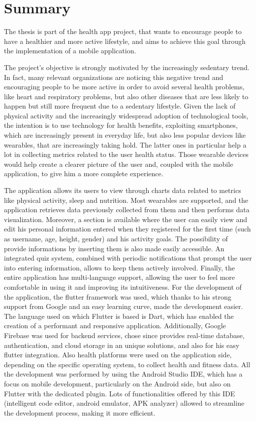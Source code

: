 \section{Summary}

The thesis is part of the health app project, that wants to encourage people to have a healthier and more active lifestyle, and aims to achieve this goal through the implementation of a mobile application.

\noindent The project's objective is strongly motivated by the increasingly sedentary trend. In fact, many relevant organizations are noticing this negative trend and encouraging people to be more active in order to avoid several health problems, like heart and respiratory problems, but also other diseases that are less likely to happen but still more frequent due to a sedentary lifestyle. Given the lack of physical activity and the increasingly widespread adoption of technological tools, the intention is to use technology for health benefits, exploiting smartphones, which are increasingly present in everyday life, but also less popular devices like wearables, that are increasingly taking hold. The latter ones in particular help a lot in collecting metrics related to the user health status. Those wearable devices would help create a clearer picture of the user and, coupled with the mobile application, to give him a more complete experience. 

\noindent The application allows its users to view through charts data related to metrics like physical activity, sleep and nutrition. Most wearables are supported, and the application retrieves data previously collected from them and then performs data visualization. Moreover, a section is available where the user can easily view and edit his personal information entered when they registered for the first time (such as username, age, height, gender) and his activity goals. The possibility of provide informations by inserting them is also made easily accessible. An integrated quiz system, combined with periodic notifications that prompt the user into entering information, allows to keep them actively involved. Finally, the entire application has multi-language support, allowing the user to feel more comfortable in using it and improving its intuitiveness.
\newpage
\noindent For the development of the application, the flutter framework was used, which thanks to his strong support from Google and an easy learning curve, made the development easier. The language used on which Flutter is based is Dart, which has enabled the creation of a performant and responsive application. Additionally, Google Firebase was used for backend services, chose since provides real-time database, authentication, and cloud storage in an unique solutions, and also for his easy flutter integration. Also health platforms were used on the application side, depending on the specific operating system, to collect health and fitness data. All the development was performed by using the Android Studio IDE, which has a focus on mobile development, particularly on the Android side, but also on Flutter with the dedicated plugin. Lots of functionalities offered by this IDE (intelligent code editor, android emulator, APK analyzer) allowed to streamline the development process, making it more efficient.

